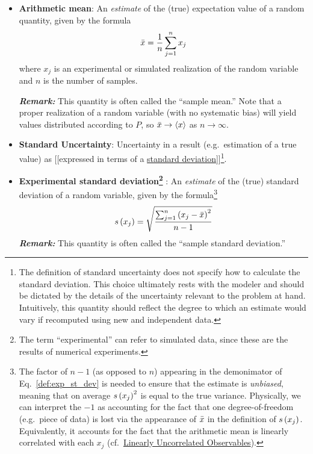 \begin{itemize}
\item {\bf Arithmetic mean}: An \emph{estimate} of the (true) expectation value of a random quantity, given by the formula
  \begin{equation}
    \bar{x} = \dfrac{1}{n} \sum_{j=1}^{n} x_j \label{def:arith_mean}
  \end{equation}
  where $x_j$ is an experimental or simulated realization of the random variable and $n$ is the number of samples. 
\smallskip 

\textbf{\textit{Remark:}} This quantity is often called the ``sample mean.''
Note that a proper realization of a random variable (with no systematic bias) will yield values distributed according to $P$, so $\bar{x} \rightarrow \langle x \rangle$ as $n \rightarrow \infty$.


\item {\bf Standard Uncertainty}: Uncertainty in a result (e.g.\ estimation of a true value) as [[expressed in terms of a \hyperref[def:st_dev]{standard deviation}]]\footnote{The definition of standard uncertainty does not specify how to calculate the standard deviation. This choice ultimately rests with the modeler and should be dictated by the details of the uncertainty relevant to the problem at hand.  Intuitively, this quantity should reflect the degree to which an estimate would vary if recomputed using new and independent data.}.  
  \label{def:std_unc}

\item {\bf Experimental standard deviation\footnote{
      The term ``experimental'' can refer to simulated data, since these are the results of numerical experiments.
}
}: An \emph{estimate} of the (true) standard deviation of a random variable, given by the formula\footnote{The factor of $n-1$ (as opposed to $n$) appearing in the demonimator of Eq.~\ref{def:exp_st_dev} is needed to ensure that the estimate is {\it unbiased}, meaning that on average $s\left( x_j \right)^2$ is equal to the true variance. Physically, we can interpret the $-1$ as accounting for the fact that one degree-of-freedom (e.g.\ piece of data) is lost via the appearance of $\bar{x}$ in the definition of $s\left( x_j \right)$.  Equivalently, it accounts for the fact that the arithmetic mean is linearly correlated with each $x_j$ (cf.\ \hyperref[def:unc_obs]{Linearly Uncorrelated Observables}).}
  \begin{equation}
    s\left( x_j \right) = \sqrt{\dfrac{\sum_{j=1}^n\left(x_j - \bar{x}\right)^2}{n-1}} \label{def:exp_st_dev}
  \end{equation}
  \smallskip
  \textbf{\textit{Remark:}} This quantity is often called the ``sample standard deviation.'' 



\end{itemize}
